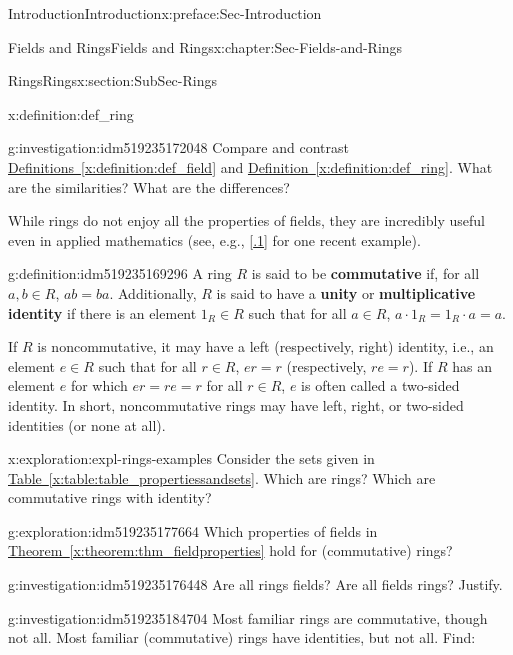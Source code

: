 \documentclass[oneside,10pt,]{book}
\newcommand{\xreffont}{\relax}
\newcommand{\terminology}[1]{\textbf{#1}}
\numberwithin{equation}{section}
\begin{document}
\begin{preface}{Introduction}{}{Introduction}{}{}{x:preface:Sec-Introduction}
\begin{chapterptx}{Fields and Rings}{}{Fields and Rings}{}{}{x:chapter:Sec-Fields-and-Rings}
\begin{sectionptx}{Rings}{}{Rings}{}{}{x:section:SubSec-Rings}
\begin{definition}{}{x:definition:def_ring}
\end{definition}
\begin{investigation}{}{g:investigation:idm519235172048}%
Compare and contrast \hyperref[x:definition:def_field]{Definitions~{\xreffont\ref{x:definition:def_field}}} and \hyperref[x:definition:def_ring]{Definition~{\xreffont\ref{x:definition:def_ring}}}. What are the similarities? What are the differences?%
\end{investigation}
While rings do not enjoy all the properties of fields, they are incredibly useful even in applied mathematics (see, e.g., \hyperlink{x:biblio:Curto2013}{[{\xreffont 2.2.1}]} for one recent example).%
\begin{definition}{}{g:definition:idm519235169296}%
%
%
%
A ring \(R\) is said to be \terminology{commutative} if, for all \(a,b\in R\), \(ab = ba\). Additionally, \(R\) is said to have a \terminology{unity} or \terminology{multiplicative identity} if there is an element \(1_R\in R\) such that for all \(a\in R\), \(a \cdot 1_R = 1_R \cdot a= a\).%
\end{definition}
If \(R\) is noncommutative, it may have a left (respectively, right) identity, i.e., an element \(e\in R\) such that for all \(r\in R\), \(er = r\) (respectively, \(re = r\)). If \(R\) has an element \(e\) for which \(er = re = r\) for all \(r\in R\), \(e\) is often called a two-sided identity. In short, noncommutative rings may have left, right, or two-sided identities (or none at all).%
\begin{exploration}{}{x:exploration:expl-rings-examples}%
Consider the sets given in \hyperref[x:table:table_propertiessandsets]{Table~{\xreffont\ref{x:table:table_propertiessandsets}}}. Which are rings? Which are commutative rings with identity?%
\end{exploration}
\begin{exploration}{}{g:exploration:idm519235177664}%
Which properties of fields in \hyperref[x:theorem:thm_fieldproperties]{Theorem~{\xreffont\ref{x:theorem:thm_fieldproperties}}} hold for (commutative) rings?%
\end{exploration}
\begin{investigation}{}{g:investigation:idm519235176448}%
Are all rings fields? Are all fields rings? Justify.%
\end{investigation}
\begin{investigation}{}{g:investigation:idm519235184704}%
Most familiar rings are commutative, though not all. Most familiar (commutative) rings have identities, but not all. Find:%

\end{investigation}
\end{sectionptx}
\end{chapterptx}
\end{preface}
\end{document}
